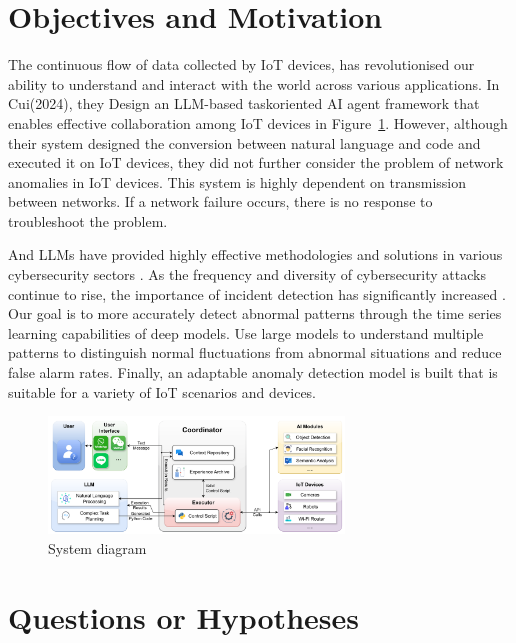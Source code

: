 \documentclass[12pt]{article}
\begin{document}
\section{Objectives and Motivation}
\label{sec:objectives}
The continuous flow of data collected by IoT devices, has revolutionised
our ability to understand and interact with the world across various applications\citep{shirali2024llm}.
In Cui(2024), they Design an LLM-based taskoriented AI agent framework that enables effective collaboration
among IoT devices in Figure~\ref{fig:llmFramwork}\citep{cui2024llmind}.
However, although their system designed the conversion between natural language and code and executed it on IoT devices,
they did not further consider the problem of network anomalies in IoT devices.
This system is highly dependent on transmission between networks.
If a network failure occurs, there is no response to troubleshoot the problem.

And LLMs have provided highly effective methodologies and solutions
in various cybersecurity sectors \citep{mohamed2024efficient}.
As the frequency and diversity of cybersecurity attacks continue to rise, the
importance of incident detection has significantly increased \citep{thandi2024revolutionizing}.
Our goal is to more accurately detect abnormal patterns through the time series learning capabilities
of deep models. Use large models to understand multiple patterns to distinguish normal fluctuations from
abnormal situations and reduce false alarm rates.
Finally, an adaptable anomaly detection model is built that is suitable for a variety of IoT scenarios and devices.

\begin{figure}[h] %
  \centering
  \includegraphics[width=0.7\textwidth]{./img/system_diagram.png} %
  \caption{System diagram}
  \label{fig:llmFramwork}
\end{figure}

\section{Questions or Hypotheses}
\label{sec:questions}
\end{document}
